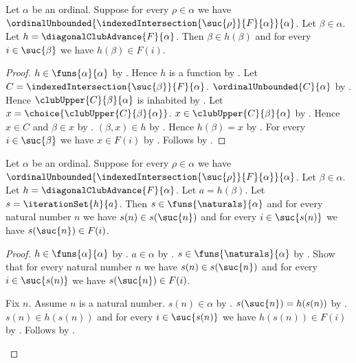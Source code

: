 \begin{proposition}\label{diagonal_club_advance_properties}
    Let $\alpha$ be an ordinal.
    Suppose for every $\rho\in\alpha$ we have
        $\ordinalUnbounded{
            \indexedIntersection{\suc{\rho}}{F}{\alpha}}{\alpha}$.
    Let $\beta\in\alpha$.
    Let $h=\diagonalClubAdvance{F}{\alpha}$.
    Then $\beta\in h(\beta)$ and for every $i\in\suc{\beta}$ we have
        $h(\beta)\in F(i)$.
\end{proposition}
\begin{proof}
    $h\in\funs{\alpha}{\alpha}$
        by .
    Hence $h$ is a function by .
    Let $C=\indexedIntersection{\suc{\beta}}{F}{\alpha}$.
    $\ordinalUnbounded{C}{\alpha}$ by \auto.
    Hence $\clubUpper{C}{\beta}{\alpha}$ is inhabited
        by .
    Let $x=\choice{\clubUpper{C}{\beta}{\alpha}}$.
    $x\in\clubUpper{C}{\beta}{\alpha}$ by .
    Hence $x\in C$ and $\beta\in x$ by .
    $(\beta,x)\in h$ by .
    Hence $h(\beta)=x$ by .
    For every $i\in\suc{\beta}$ we have $x\in F(i)$
        by .
    Follows by \auto.
\end{proof}

\begin{proposition}\label{diagonal_club_iteration_properties}
    Let $\alpha$ be an ordinal.
    Suppose for every $\rho\in\alpha$ we have
        $\ordinalUnbounded{
            \indexedIntersection{\suc{\rho}}{F}{\alpha}}{\alpha}$.
    Let $\beta\in\alpha$.
    Let $h=\diagonalClubAdvance{F}{\alpha}$.
    Let $a=h(\beta)$.
    Let $s=\iterationSet{h}{a}$.
    Then $s\in\funs{\naturals}{\alpha}$ and
        for every natural number $n$ we have
            $s(n)\in s(\suc{n})$ and
            for every $i\in\suc{s(n)}$ we have
                $s(\suc{n})\in F(i)$.
\end{proposition}
\begin{proof}
    $h\in\funs{\alpha}{\alpha}$
        by .
    $a\in\alpha$ by .
    $s\in\funs{\naturals}{\alpha}$
        by .
    Show that for every natural number $n$ we have
        $s(n)\in s(\suc{n})$ and
        for every $i\in\suc{s(n)}$ we have
            $s(\suc{n})\in F(i)$.
    \begin{subproof}
        Fix $n$.
        Assume $n$ is a natural number.
        $s(n)\in\alpha$ by .
        $s(\suc{n})=h(s(n))$
            by .
        $s(n)\in h(s(n))$ and for every $i\in\suc{s(n)}$ we have
            $h(s(n))\in F(i)$
            by .
        Follows by \auto.
    \end{subproof}
\end{proof}

